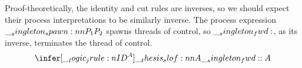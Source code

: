 
Proof-theoretically, the identity and cut rules are inverses, so we should expect their process interpretations to be similarly inverse.
The process expression $\__singleton_spawn:nn {P_1} {P_2}$ spawns threads of control, so $\__singleton_fwd:$, as its inverse, terminates the thread of control.
\begin{equation*}
  \infer[\jrule{ID}^A]{\slof{A |- \fwd : A}}{}
\end{equation*}












